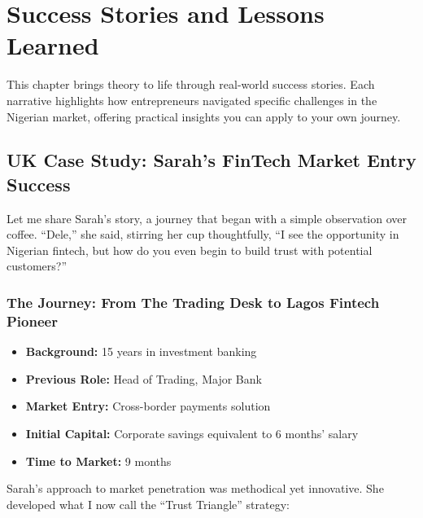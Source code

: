 \chapter{Success Stories and Lessons Learned}\label{ch:success-stories-and-lessons-learned}

\begin{importantbox}
This chapter brings theory to life through real-world success stories. Each narrative highlights how entrepreneurs navigated specific challenges in the Nigerian market, offering practical insights you can apply to your own journey.
\end{importantbox}

\section{UK Case Study: Sarah's FinTech Market Entry Success}\label{sec:uk-case-study:-sarah's-fintech-market-entry-success}

Let me share Sarah's story, a journey that began with a simple observation over coffee. ``Dele,'' she said, stirring her cup thoughtfully, ``I see the opportunity in Nigerian fintech, but how do you even begin to build trust with potential customers?''

\subsection{The Journey: From The Trading Desk to Lagos Fintech Pioneer}\label{subsec:the-journey:-from-the-trading-desk-to-lagos-fintech-pioneer}
\begin{tcolorbox}[colback=white,colframe=primarydark,title=\textbf{Sarah's Profile}]
\begin{itemize}
    \item \textbf{Background:} 15 years in investment banking
    \item \textbf{Previous Role:} Head of Trading, Major Bank
    \item \textbf{Market Entry:} Cross-border payments solution
    \item \textbf{Initial Capital:} Corporate savings equivalent to 6 months' salary
    \item \textbf{Time to Market:} 9 months
\end{itemize}
\end{tcolorbox}

Sarah's approach to market penetration was methodical yet innovative. She developed what I now call the ``Trust Triangle'' strategy:

